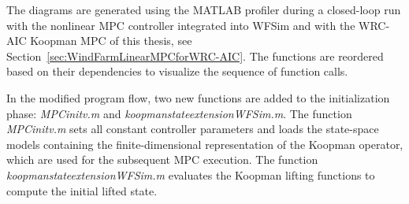 
The diagrams are generated using the MATLAB profiler during a closed-loop run with the nonlinear MPC controller integrated into WFSim and with the WRC-AIC Koopman MPC of this thesis, see Section~\ref{sec:WindFarmLinearMPCforWRC-AIC}. The functions are reordered based on their dependencies to visualize the sequence of function calls.

    \item In the modified program flow, two new functions are added to the initialization phase: \textit{MPCinitv.m} and \textit{koopmanstateextensionWFSim.m}. The function \textit{MPCinitv.m} sets all constant controller parameters and loads the state-space models containing the finite-dimensional representation of the Koopman operator, which are used for the subsequent MPC execution. The function \textit{koopmanstateextensionWFSim.m} evaluates the Koopman lifting functions to compute the initial lifted state.

